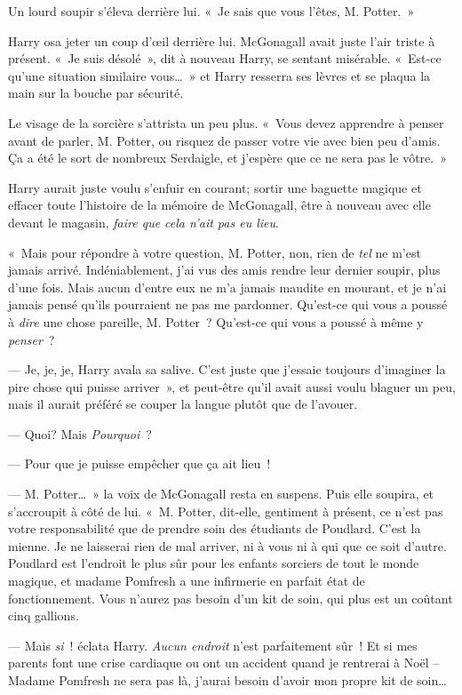 Un lourd soupir s'éleva derrière lui. «~Je sais que vous l'êtes, M. Potter.~»

Harry osa jeter un coup d'œil derrière lui.
McGonagall avait juste l'air triste à présent.
«~Je suis désolé~», dit à nouveau Harry, se sentant misérable.
«~Est-ce qu'une situation similaire vous…~» et Harry resserra ses lèvres et se plaqua la main sur la bouche par sécurité.

Le visage de la sorcière s'attrista un peu plus.
«~Vous devez apprendre à penser avant de parler, M. Potter, ou risquez de passer votre vie avec bien peu d'amis.
Ça a été le sort de nombreux Serdaigle, et j'espère que ce ne sera pas le vôtre.~»

Harry aurait juste voulu s'enfuir en courant; sortir une baguette magique et effacer toute l'histoire de la mémoire de McGonagall, être à nouveau avec elle devant le magasin, \emph{faire que cela n'ait pas eu lieu}.

«~Mais pour répondre à votre question, M. Potter, non, rien de \emph{tel} ne m'est jamais arrivé.
Indéniablement, j'ai vus des amis rendre leur dernier soupir, plus d'une fois.
Mais aucun d'entre eux ne m'a jamais maudite en mourant, et je n'ai jamais pensé qu'ils pourraient ne pas me pardonner.
Qu'est-ce qui vous a poussé à \emph{dire} une chose pareille, M. Potter~? Qu'est-ce qui vous a poussé à même y \emph{penser}~?

--- Je, je,  je, Harry avala sa salive. C'est juste que j'essaie toujours d'imaginer la pire chose qui puisse arriver~», et peut-être qu'il avait aussi voulu blaguer un peu, mais il aurait préféré se couper la langue plutôt que de l'avouer.

--- Quoi? Mais \emph{Pourquoi}~?

--- Pour que je puisse empêcher que ça ait lieu~!

--- M. Potter…~» la voix de McGonagall resta en suspens.  Puis elle soupira, et s'accroupit à côté de lui.
«~M. Potter, dit-elle, gentiment à présent, ce n'est pas votre responsabilité que de prendre soin des étudiants de Poudlard. C'est la mienne.
Je ne laisserai rien de mal arriver, ni à vous ni à qui que ce soit d'autre.
Poudlard est l'endroit le plus sûr pour les enfants sorciers de tout le monde magique, et madame Pomfresh a une infirmerie en parfait état de fonctionnement.
Vous n'aurez pas besoin d'un kit de soin, qui plus est un coûtant cinq gallions.

--- Mais \emph{si}~! éclata Harry. \emph{Aucun endroit} n'est parfaitement sûr~! Et si mes parents font une crise cardiaque ou ont un accident quand je rentrerai à Noël -- Madame Pomfresh ne sera pas là, j'aurai besoin d'avoir mon propre kit de soin…

